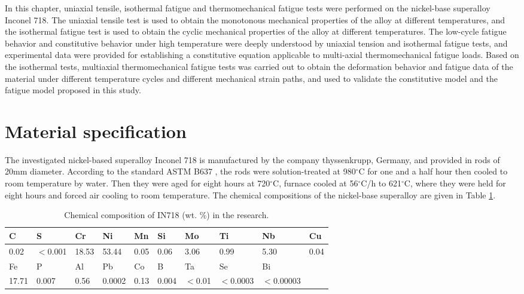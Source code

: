 In this chapter, uniaxial tensile, isothermal fatigue and thermomechanical fatigue tests were performed on the nickel-base superalloy Inconel 718. The uniaxial tensile test is used to obtain the monotonous mechanical properties of the alloy at different temperatures, and the isothermal fatigue test is used to obtain the cyclic mechanical properties of the alloy at different temperatures. The low-cycle fatigue behavior and constitutive behavior under high temperature were deeply understood by uniaxial tension and isothermal fatigue tests, and experimental data were provided for establishing a constitutive equation applicable to multi-axial thermomechanical fatigue loads. Based on the isothermal tests, multiaxial thermomechanical fatigue tests was carried out to obtain the deformation behavior and fatigue data of the material under different temperature cycles and different mechanical strain paths, and used to validate the constitutive model and the fatigue model proposed in this study.

\section{Material specification}
\noindent
The investigated nickel-based superalloy Inconel 718 is manufactured by the company thyssenkrupp, Germany, and provided in rods of 20mm diameter. According to the standard ASTM B637 \cite{ASTMB63716}, the rods were solution-treated at 980$^{\circ}$C for one and a half hour then cooled to room temperature by water. Then they were aged for eight hours at 720$^{\circ}$C, furnace cooled at 56$^{\circ}$C/h to 621$^{\circ}$C, where they were held for eight hours and forced air cooling to room temperature.
The chemical compositions of the nickel-base superalloy are given in Table \ref{Tab:ChemicalCompositionofIN718}.

\begin{table}[htbp]
  \centering
  \caption{Chemical composition of IN718 (wt. \%) in the research.}
    \begin{tabular}{llllllllll}
    \toprule
    C     & S     & Cr    & Ni    & Mn    & Si    & Mo    & Ti    & Nb    & Cu \\
    \midrule
    0.02  & $<$0.001 & 18.53 & 53.44 & 0.05  & 0.06  & 3.06  & 0.99  & 5.30  & 0.04 \\
    \midrule
    Fe    & P     & Al    & Pb    & Co    & B     & Ta    & Se    & Bi    &  \\
    \midrule
    17.71 & 0.007 & 0.56  & 0.0002 & 0.13  & 0.004 & $<$0.01 & $<$0.0003 & $<$0.00003 &  \\
    \bottomrule
    \end{tabular}%
  \label{Tab:ChemicalCompositionofIN718}%
\end{table}%

